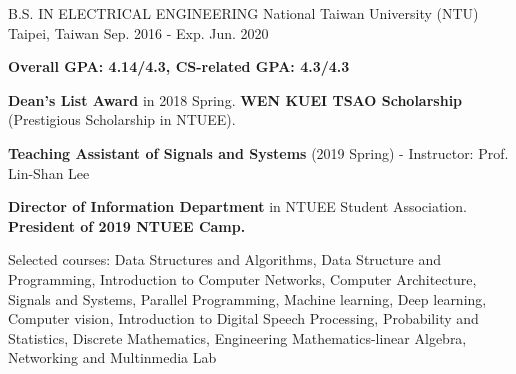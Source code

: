 

\begin{cventries}

  \cventry
    {B.S. IN ELECTRICAL ENGINEERING } %
    {National Taiwan University (NTU) } %
    {Taipei, Taiwan} %
    {Sep. 2016 - Exp. Jun. 2020} %
    {
      \begin{cvitems} %
        \item {\textbf{Overall GPA: 4.14/4.3, CS-related GPA: 4.3/4.3} }
        \item {\textbf{Dean’s List Award} in 2018 Spring. \textbf{WEN KUEI TSAO Scholarship} (Prestigious Scholarship in NTUEE).}
        \item {\textbf{Teaching Assistant of Signals and Systems} (2019 Spring) - Instructor: Prof. Lin-Shan Lee}
        \item {\textbf{Director of Information Department} in NTUEE Student Association. \textbf{President of 2019 NTUEE Camp.}}
        \item {Selected courses: Data Structures and Algorithms, Data Structure and Programming, Introduction to Computer Networks, Computer Architecture, Signals and Systems, Parallel Programming, Machine learning, Deep learning, Computer vision, Introduction to Digital Speech Processing, Probability and Statistics, Discrete Mathematics, Engineering Mathematics-linear Algebra, Networking and Multinmedia Lab}
      \end{cvitems}
    }

\end{cventries}
